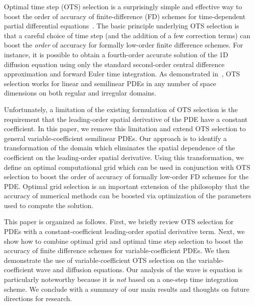 \documentclass[twocolumn]{article} %
\makeatletter
\def\section{\@startsection {section}{1}{\z@}{1.0ex plus
1ex minus .2ex}{.2ex plus .2ex}{\large\bf}}
\makeatother
\begin{document}
\section{Introduction}
\label{Introduction}
Optimal time step (OTS) selection is a surprisingly simple and effective way to 
boost the order of accuracy of finite-difference (FD) schemes for 
time-dependent partial differential equations~\cite{chu_otspde}.  The basic
principle underlying OTS selection is that a careful choice of time step (and 
the addition of a few correction terms) can boost the \emph{order} of 
accuracy for formally low-order finite difference schemes.  For instance, it 
is possible to obtain a fourth-order accurate solution of the 1D diffusion 
equation using only the standard second-order central difference approximation 
and forward Euler time integration.  As demonstrated in~\cite{chu_otspde}, OTS 
selection works for linear and semilinear PDEs in any number of space 
dimensions on both regular and irregular domains.  

Unfortunately, a limitation of the existing formulation of OTS selection is 
the requirement that the leading-order spatial derivative of the PDE have a 
constant coefficient.  In this paper, we remove this limitation and extend OTS 
selection to general variable-coefficient semilinear PDEs.  
Our approach is to identify a transformation of the domain which 
eliminates the spatial dependence of the coefficient on the leading-order 
spatial derivative.  Using this transformation, we define an optimal 
computational grid which can be used in conjunction with OTS selection to 
boost the order of accuracy of formally low-order FD schemes for the PDE.  
Optimal grid selection is an important extension of the philosophy that the 
accuracy of numerical methods can be boosted via optimization of the 
parameters used to compute the solution.

This paper is organized as follows.  First, we briefly review OTS selection 
for PDEs with a constant-coefficient leading-order spatial derivative term.  
Next, we show how to combine optimal grid and optimal time step selection to 
boost the accuracy of finite difference schemes for variable-coefficient PDEs.  
We then demonstrate the use of variable-coefficient OTS selection on the 
variable-coefficient wave and diffusion equations.  Our analysis of the wave is 
equation is particularly noteworthy because it is \emph{not} based on a one-step 
time integration scheme.  We conclude with a summary of our main results
and thoughts on future directions for research.
\end{document}
